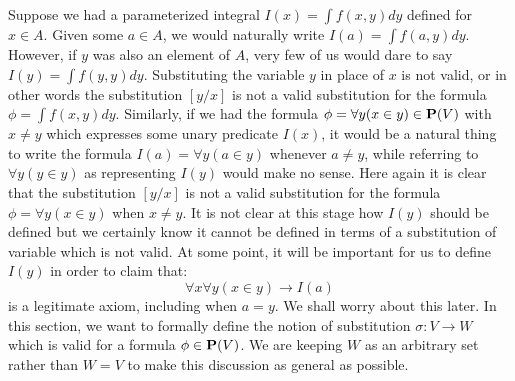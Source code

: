 Suppose we had a parameterized integral $I(x)=\int f(x,y)dy$ defined
for $x\in A$. Given some $a\in A$, we would naturally write
$I(a)=\int f(a,y)dy$. However, if $y$ was also an element of $A$,
very few of us would dare to say $I(y)=\int f(y,y)dy$. Substituting
the variable $y$ in place of $x$ is not valid, or in other words the
substitution $[y/x]$ is not a valid substitution for the formula
$\phi=\int f(x,y)dy$. Similarly, if we had the formula $\phi=\forall
y (x\in y)\in\mbox{${\bf P}(V)$}$ with $x\neq y$ which expresses some unary
predicate $I(x)$, it would be a natural thing to write the formula
$I(a)=\forall y(a\in y)$ whenever $a\neq y$, while referring to
$\forall y(y\in y)$ as representing $I(y)$ would make no sense. Here
again it is clear that the substitution $[y/x]$ is not a valid
substitution for the formula $\phi=\forall y(x\in y)$ when $x\neq
y$. It is not clear at this stage how $I(y)$ should be defined but
we certainly know it cannot be defined in terms of a substitution of
variable which is not valid. At some point, it will be important for
us to define $I(y)$ in order to claim that:
    \[
    \forall x\forall y(x\in y)\to I(a)
    \]
is a legitimate axiom, including when $a=y$. We shall worry about
this later. In this section, we want to formally define the notion
of substitution $\sigma:V\to W$ which is valid for a formula
$\phi\in\mbox{${\bf P}(V)$}$. We are keeping $W$ as an arbitrary set rather than
$W=V$ to make this discussion as general as possible.

